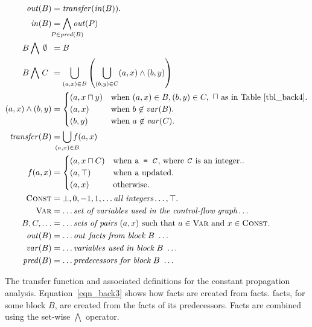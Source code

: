 \begin{myfig}
\begin{align}
  \outBa &= \mathit{transfer}(\inBa). \label{eqn_back3} \\
  \inBa &= \bigwedge\limits_{\mathclap{P \in \mathit{pred}(B)}} \outXa{P} \label{eqn_back16}\\ 
  B \bigwedge\ \,\mathclap{\emptyset}\phantom{C} &= B \notag\\
  B \bigwedge\ \,\mathclap{C}\phantom{C} &= \bigcup\limits_{(a,x) \in B}
                    \left(\bigcup\limits_{(b,y) \in C} (a,x) \wedge (b,y)\right) \label{eqn_back12}\\ 
  (a,x) \wedge (b,y) &= 
  \begin{cases}
    (a,x \lub y) & \text{when}\ (a,x) \in B, (b,y) \in C,\ \text{\lub as in Table~\ref{tbl_back4}.}\\
    (a,x) & \text{when}\ b \not\in \mathit{var}(B). \\
    (b,y) & \text{when}\ a \not\in \mathit{var}(C). \\
  \end{cases} \label{eqn_back13}\\ 
  \mathit{transfer}(B) &= \bigcup\limits_{\mathclap{(a,x) \in B}} f(a,x) \label{eqn_back15}\\
  f (a,x) &= 
  \begin{cases}
    (a,x \lub C) & \text{when \texttt{a = \emph{C}}, where \texttt{\emph{C}} is an integer.}. \\
    (a,\top) & \text{when \texttt{a} updated}. \\
    (a,x) & \text{otherwise}. \label{eqn_back14}\\
  \end{cases} \\
  \setLC &= \bot, 0, -1, 1, \dots \text{\it all integers} \dots, \top. \notag\\
  \setL{Var} &= \dots \text{\it set of variables used in the control-flow graph} \dots \notag\\
  B, C, \dots &= \dots \text{\it sets of pairs}\ (a, x)\ \text{such that}\ a \in 
    \setL{Var}\ \text{and}\ x \in \setLC. \notag\\
  \mathit{out}(B) &= \dots \text{\it \out facts from block}\ B\ \dots \notag\\
  \mathit{var}(B) &= \dots \text{\it variables used in block}\ B\ \dots \notag\\
  \mathit{pred}(B) &= \dots \text{\it predecessors for block}\ B\ \dots \notag
\end{align}
\caption{The transfer function and associated definitions for the constant
  propagation analysis. Equation~\eqref{eqn_back3} shows how \out facts are
  created from \inE facts. \InBa facts, for some block $B$, are created from
  the \outBa facts of its predecessors. Facts are combined using the set-wise
  $\bigwedge$ operator.}
\label{fig_back10}
\end{myfig}
